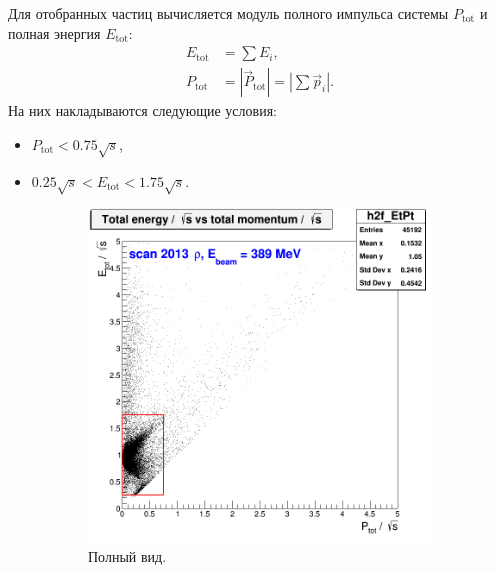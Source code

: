 Для отобранных частиц вычисляется модуль полного импульса системы $P_{\text{tot}}$ и полная энергия $E_{\text{tot}}$:
\begin{align}
    E_{\text{tot}} &= \sum E_i , \\
    P_{\text{tot}} &= \left| \vec{P}_{\text{tot}} \right| = \left| \sum \vec{p}_i \right| .
\end{align}
На них накладываются следующие условия:
\begin{itemize}
    \item $P_{\text{tot}} < 0.75 \sqrt{s}$,
    \item $0.25 \sqrt{s} < E_{\text{tot}} < 1.75 \sqrt{s}$.
\end{itemize}
\begin{figure}[htbp]
    \centering
    \begin{subfigure}[b]{0.45\textwidth}
        \includegraphics[width=\textwidth]{img/h2f_EtPt.png}
        \caption{Полный вид.}
        \label{fig:3pi_EtPt_full}
    \end{subfigure}
    ~
    \begin{subfigure}[b]{0.45\textwidth}

\end{subfigure}
\end{figure}
